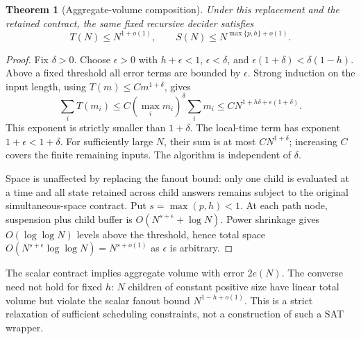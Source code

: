 \documentclass[11pt]{article}
\newtheorem{theorem}{Theorem}
\begin{document}
\begin{theorem}[Aggregate-volume composition]
Under this replacement and the retained contract, the same fixed
recursive decider satisfies
\[
 T(N)\le N^{1+o(1)},\qquad
 S(N)\le N^{\max\{p,h\}+o(1)}.
\]
\end{theorem}
\begin{proof}
Fix $\delta>0$. Choose $\epsilon>0$ with $h+\epsilon<1$,
$\epsilon<\delta$, and
$\epsilon(1+\delta)<\delta(1-h)$. Above a fixed threshold all error
terms are bounded by $\epsilon$. Strong induction on the input length,
using $T(m)\le C m^{1+\delta}$, gives
\[
 \sum_i T(m_i)
 \le C (\max_i m_i)^\delta\sum_i m_i
 \le C N^{1+h\delta+\epsilon(1+\delta)}.
\]
This exponent is strictly smaller than $1+\delta$. The local-time term
has exponent $1+\epsilon<1+\delta$. For sufficiently large $N$, their
sum is at most $C N^{1+\delta}$; increasing $C$ covers the finite
remaining inputs. The algorithm is independent of $\delta$.

Space is unaffected by replacing the fanout bound: only one child is
evaluated at a time and all state retained across child answers remains
subject to the original simultaneous-space contract. Put
$s=\max(p,h)<1$. At each path node, suspension plus child buffer is
$O(N^{s+\epsilon}+\log N)$. Power shrinkage gives
$O(\log\log N)$ levels above the threshold, hence total space
$O(N^{s+\epsilon}\log\log N)=N^{s+o(1)}$ as $\epsilon$ is arbitrary.
\end{proof}

The scalar contract implies aggregate volume with error $2e(N)$.
The converse need not hold for fixed $h$: $N$ children of constant
positive size have linear total volume but violate the scalar fanout
bound $N^{1-h+o(1)}$. This is a strict relaxation of sufficient
scheduling constraints, not a construction of such a SAT wrapper.
\end{document}
